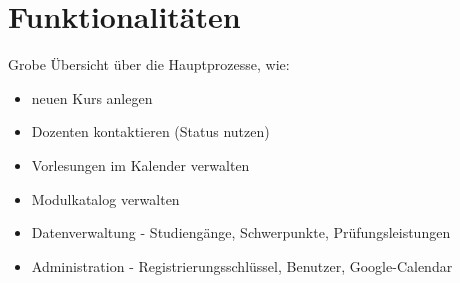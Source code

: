 \section{Funktionalitäten}

Grobe Übersicht über die Hauptprozesse, wie: 
\begin{itemize}
	\item neuen Kurs anlegen 
	\item Dozenten kontaktieren (Status nutzen)
	\item Vorlesungen im Kalender verwalten
	\item Modulkatalog verwalten
	\item Datenverwaltung - Studiengänge, Schwerpunkte, Prüfungsleistungen 
	\item Administration - Registrierungsschlüssel, Benutzer, Google-Calendar
\end{itemize}